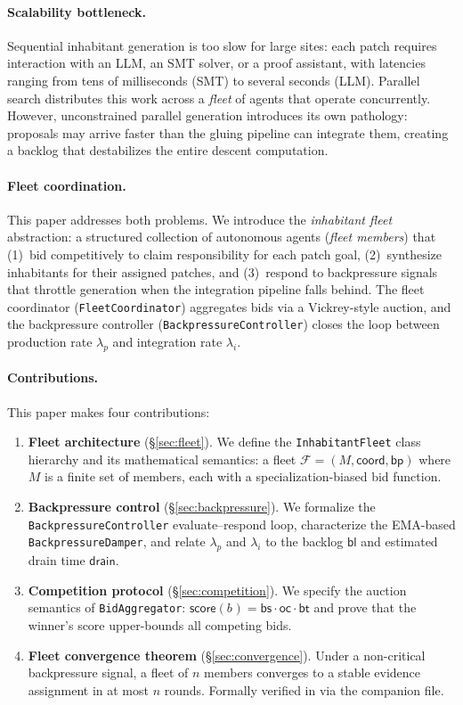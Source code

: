 \documentclass[11pt]{article}
\providecommand{\Fleet}{\mathcal{F}}               %
\providecommand{\Members}{M}                        %
\providecommand{\Fcoord}{\mathsf{coord}}           %
\providecommand{\bid}[1]{b_{#1}}                   %
\providecommand{\prodrate}{\lambda_p}              %
\providecommand{\intrate}{\lambda_i}               %
\providecommand{\backlog}{\mathsf{bl}}             %
\providecommand{\draintime}{\mathsf{drain}}        %
\providecommand{\score}{\mathsf{score}}            %
\providecommand{\bpctrl}{\mathsf{bp}}              %
\providecommand{\FleetPY}{\texttt{InhabitantFleet}}
\providecommand{\CoordPY}{\texttt{FleetCoordinator}}
\providecommand{\AggPY}{\texttt{BidAggregator}}
\providecommand{\BPCtrlPY}{\texttt{BackpressureController}}
\providecommand{\DamperPY}{\texttt{BackpressureDamper}}
\begin{document}
\paragraph{Scalability bottleneck.}
Sequential inhabitant generation is too slow for large sites: each patch
requires interaction with an LLM, an SMT solver, or a proof assistant, with
latencies ranging from tens of milliseconds (SMT) to several seconds (LLM).
Parallel search distributes this work across a \emph{fleet} of agents that
operate concurrently.  However, unconstrained parallel generation introduces
its own pathology: proposals may arrive faster than the gluing pipeline can
integrate them, creating a backlog that destabilizes the entire descent
computation.

\paragraph{Fleet coordination.}
This paper addresses both problems.  We introduce the \emph{inhabitant fleet}
abstraction: a structured collection of autonomous agents (\emph{fleet members})
that (1)~bid competitively to claim responsibility for each patch goal,
(2)~synthesize inhabitants for their assigned patches, and (3)~respond to
backpressure signals that throttle generation when the integration pipeline
falls behind.  The fleet coordinator (\CoordPY{}) aggregates bids via a
Vickrey-style auction, and the backpressure controller (\BPCtrlPY{}) closes
the loop between production rate $\prodrate$ and integration rate $\intrate$.

\paragraph{Contributions.}
This paper makes four contributions:
\begin{enumerate}[leftmargin=1.5em]
\item \textbf{Fleet architecture} (\S\ref{sec:fleet}).  We define the
  \FleetPY{} class hierarchy and its mathematical semantics: a fleet
  $\Fleet = (\Members, \Fcoord, \bpctrl)$ where $\Members$ is a finite set of
  members, each with a specialization-biased bid function.

\item \textbf{Backpressure control} (\S\ref{sec:backpressure}).  We formalize
  the \BPCtrlPY{} evaluate--respond loop, characterize the EMA-based
  \DamperPY{}, and relate $\prodrate$ and $\intrate$ to the backlog $\backlog$
  and estimated drain time $\draintime$.

\item \textbf{Competition protocol} (\S\ref{sec:competition}).  We specify
  the auction semantics of \AggPY{}: $\score(\bid{}) = \mathsf{bs} \cdot
  \mathsf{oc} \cdot \mathsf{bt}$ and prove that the winner's score upper-bounds
  all competing bids.

\item \textbf{Fleet convergence theorem} (\S\ref{sec:convergence}).
  Under a non-critical backpressure signal, a fleet of $n$ members converges to
  a stable evidence assignment in at most $n$ rounds.  Formally verified in
  \LEAN{} via the companion file.
\end{enumerate}
\end{document}
